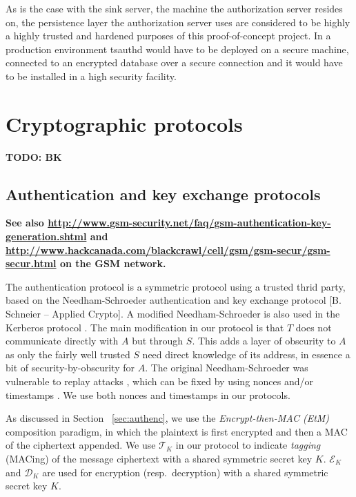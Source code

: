 As is the case with the sink server, the machine the authorization server resides on, the persistence layer the authorization server uses are considered to be highly a highly trusted and hardened purposes of this proof-of-concept project. In a production environment tsauthd would have to be deployed on a secure machine, connected to an encrypted database over a secure connection and it would have to be installed in a high security facility.

\section{Cryptographic protocols}
\label{sec:cryptographic-protocols}

\textbf{TODO: BK}

\subsection{Authentication and key exchange protocols}
\label{sec:cryptographic-protocols-authentication}

\textbf{See also \url{http://www.gsm-security.net/faq/gsm-authentication-key-generation.shtml} and \url{http://www.hackcanada.com/blackcrawl/cell/gsm/gsm-secur/gsm-secur.html} on the GSM network.}

The authentication protocol is a symmetric protocol using a trusted thrid party, based on the Needham-Schroeder authentication and key exchange protocol  [B. Schneier -- Applied Crypto]. A modified Needham-Schroeder is also used in the Kerberos protocol . The main modification in our protocol is that $T$ does not communicate directly with $A$ but through $S$. This adds a layer of obscurity to $A$ as only the fairly well trusted $S$ need direct knowledge of its address, in essence a bit of security-by-obscurity for $A$.
%
The original Needham-Schroeder was vulnerable to replay attacks , which can be fixed by using nonces and/or timestamps \cite{needham1987}. We use both nonces and timestamps in our protocols.

As discussed in Section ~\ref{sec:authenc}, we use the \textit{Encrypt-then-MAC (EtM)}  composition paradigm, in which the plaintext is first encrypted and then a MAC of the ciphertext appended. We use $\mathcal{T}_K$ in our protocol to indicate \textit{tagging} (MACing) of the message ciphertext with a shared symmetric secret key $K$. $\mathcal{E}_K$ and $\mathcal{D}_K$ are used for encryption (resp.\ decryption) with a shared symmetric secret key $K$.

